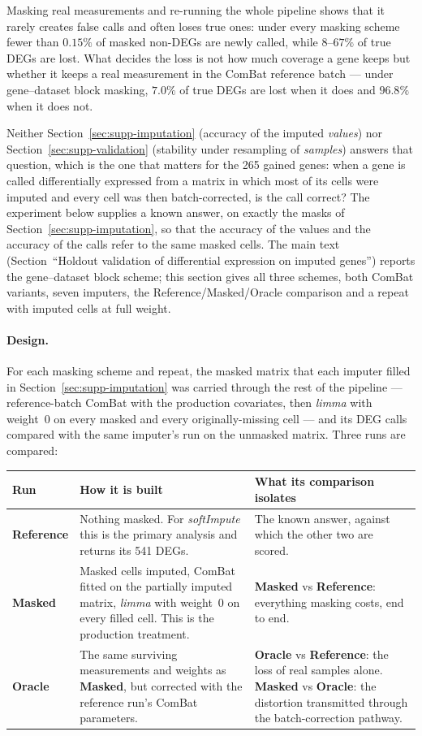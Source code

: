 \documentclass[11pt,a4paper]{article}
\begin{document}
Masking real measurements and re-running the whole pipeline
shows that it rarely creates false calls and often loses true ones: under
every masking scheme fewer than $0.15\%$ of masked non-DEGs are
newly called, while $8$--$67\%$ of true DEGs are lost. What
decides the loss is not how much coverage a gene keeps but
whether it keeps a real measurement in the ComBat reference
batch --- under gene--dataset block masking, $7.0\%$ of true
DEGs are lost when it does and $96.8\%$ when it does not.

Neither Section~\ref{sec:supp-imputation} (accuracy of the
imputed \emph{values}) nor Section~\ref{sec:supp-validation}
(stability under resampling of \emph{samples}) answers that
question, which is the one that matters for the 265 gained
genes: when a gene is called differentially expressed from a
matrix in which most of its cells were imputed and every cell
was then batch-corrected, is the call correct? The experiment
below supplies a known answer, on exactly the masks of
Section~\ref{sec:supp-imputation}, so that the accuracy of the
values and the accuracy of the calls refer to the same masked
cells. The main text (Section~``Holdout validation of
differential expression on imputed genes'') reports the
gene--dataset block scheme; this section gives all three
schemes, both ComBat variants, seven imputers, the
Reference/Masked/Oracle comparison and a repeat with imputed cells
at full weight.

\paragraph{Design.}
For each masking scheme and repeat, the masked matrix that each
imputer filled in Section~\ref{sec:supp-imputation} was carried
through the rest of the pipeline --- reference-batch ComBat with
the production covariates, then \textit{limma} with weight~0 on
every masked and every originally-missing cell --- and its DEG
calls compared with the same imputer's run on the unmasked
matrix. Three runs are compared:

\smallskip
\noindent
\begin{tabularx}{\textwidth}{@{}lXX@{}}
\toprule
\textbf{Run} & \textbf{How it is built} &
  \textbf{What its comparison isolates} \\
\midrule
\textbf{Reference} & Nothing masked. For \textit{softImpute} this is
  the primary analysis and returns its 541 DEGs. &
  The known answer, against which the other two are scored. \\
\addlinespace
\textbf{Masked} & Masked cells imputed, ComBat fitted on the
  partially imputed matrix, \textit{limma} with weight~0 on
  every filled cell. This is the production treatment. &
  \textbf{Masked} vs \textbf{Reference}: everything masking costs,
  end to end. \\
\addlinespace
\textbf{Oracle} & The same surviving measurements and weights
  as \textbf{Masked}, but corrected with the reference run's
  ComBat parameters. &
  \textbf{Oracle} vs \textbf{Reference}: the loss of real samples
  alone. \textbf{Masked} vs \textbf{Oracle}: the distortion
  transmitted through the batch-correction pathway. \\
\bottomrule
\end{tabularx}
\smallskip
\end{document}
